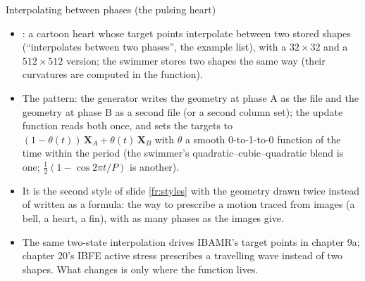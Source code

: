\documentclass[aspectratio=169,11pt]{beamer}
\begin{document}
\begin{frame}{Interpolating between phases (the pulsing heart)}
\label{fr:phases}
\small
\begin{itemize}
  \item {}: a cartoon heart whose target points interpolate between two stored shapes (``interpolates between two phases'', the example list), with a $32 \times 32$ and a $512 \times 512$ version; the swimmer stores two shapes the same way (their curvatures are computed in the function).
  \item The pattern: the generator writes the geometry at phase A as the  file and the geometry at phase B as a second file (or a second column set); the update function reads both once, and sets the targets to $(1 - \theta(t))\,\mathbf{X}_A + \theta(t)\,\mathbf{X}_B$ with $\theta$ a smooth 0-to-1-to-0 function of the time within the period (the swimmer's quadratic--cubic--quadratic blend is one; $\tfrac12(1 - \cos 2\pi t/P)$ is another).
  \item It is the second style of slide \ref{fr:styles} with the geometry drawn twice instead of written as a formula: the way to prescribe a motion traced from images (a bell, a heart, a fin), with as many phases as the images give.
  \item The same two-state interpolation drives IBAMR's target points in chapter 9a; chapter 20's IBFE active stress prescribes a travelling wave instead of two shapes. What changes is only where the function lives.
\end{itemize}
\end{frame}
\end{document}
